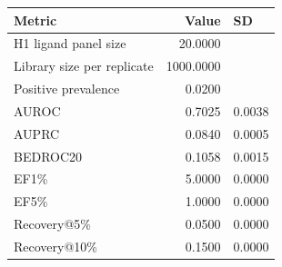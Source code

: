 \begin{tabular}{lrl}
\toprule
Metric & Value & SD \\
\midrule
H1 ligand panel size & 20.0000 &  \\
Library size per replicate & 1000.0000 &  \\
Positive prevalence & 0.0200 &  \\
AUROC & 0.7025 & 0.0038 \\
AUPRC & 0.0840 & 0.0005 \\
BEDROC20 & 0.1058 & 0.0015 \\
EF1\% & 5.0000 & 0.0000 \\
EF5\% & 1.0000 & 0.0000 \\
Recovery@5\% & 0.0500 & 0.0000 \\
Recovery@10\% & 0.1500 & 0.0000 \\
\bottomrule
\end{tabular}
